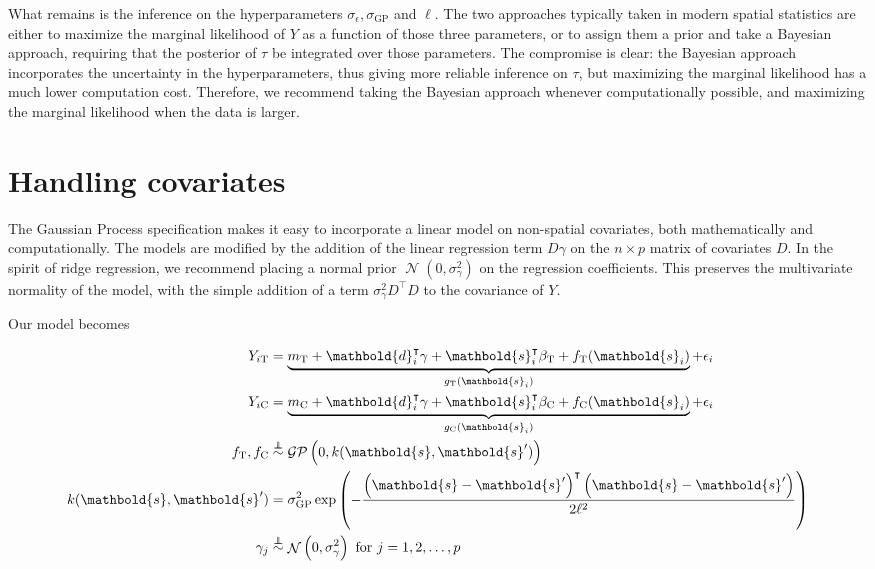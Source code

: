 \documentclass[letter]{article}
\DeclareMathOperator{\normal}{\mathcal{N}}
\newcommand{\gp}{\mathcal{GP}}
\newcommand{\trans}{^{\intercal}}
\newcommand{\treat}{\mathrm{T}}
\newcommand{\ctrol}{\mathrm{C}}
\newcommand{\sigmaf}{\sigma_{\mathrm{GP}}}
\newcommand{\sigman}{\sigma_{\epsilon}}
\newcommand{\sigmagamma}{\sigma_{\gamma}}
\newcommand{\svec}{\mathbold{s}}
\newcommand{\dvec}{\mathbold{d}}
\newcommand{\indep}{\protect\mathpalette{\protect\independenT}{\perp}}
\def\independenT#1#2{\mathrel{\rlap{$#1#2$}\mkern2mu{#1#2}}}
\begin{document}
What remains is the inference on the hyperparameters \(\sigman, \sigmaf\) and \(\ell\). The two approaches typically taken in modern spatial statistics are either to maximize the marginal likelihood of \(Y\) as a function of those three parameters, or to assign them a prior and take a Bayesian approach, requiring that the posterior of \(\tau\) be integrated over those parameters. The compromise is clear: the Bayesian approach incorporates the uncertainty in the hyperparameters, thus giving more reliable inference on \(\tau\), but maximizing the marginal likelihood has a much lower computation cost. Therefore, we recommend taking the Bayesian approach whenever computationally possible, and maximizing the marginal likelihood when the data is larger.
    


    	\section{Handling covariates}\label{handling-covariates}

The Gaussian Process specification makes it easy to incorporate a linear model on non-spatial covariates, both mathematically and computationally.
The models are modified by the addition of the linear regression term \(D \gamma\) on the \(n \times p\) matrix of covariates \(D\). In the spirit of ridge regression, we recommend placing a normal prior \(\normal(0,\sigmagamma^2)\) on the regression coefficients. This preserves the multivariate normality of the model, with the simple addition of a term \(\sigmagamma^2 D\trans D\) to the covariance of \(Y\).

Our model becomes

\begin{equation}
\begin{split}
Y_{i\treat} &= \underbrace{m_\treat{} + \dvec_i\trans \gamma + \svec_i\trans\beta_\treat{} + f_\treat{}(\svec_i)}_{g_\treat{}(\svec_i)} + \epsilon_i \\
Y_{i\ctrol} &= \underbrace{m_\ctrol{} + \dvec_i\trans \gamma + \svec_i\trans\beta_\ctrol{} + f_\ctrol{}(\svec_i)}_{g_\ctrol{}(\svec_i)} + \epsilon_i \\
f_\treat{}, f_\ctrol{} &\overset{\indep}{\sim} \gp\del{0, k(\svec, \svec')} \\
k(\svec,\svec') &= \sigmaf^2 \exp\del{ - \frac{\del{\svec-\svec'}\trans\del{\svec-\svec'}}{2 \ell^2}} \\
\gamma_j &\overset{\indep}{\sim} \normal\del{0,\sigmagamma^2}\text{ for }j=1,2,\ldots,p
\end{split}
\end{equation}
\end{document}
